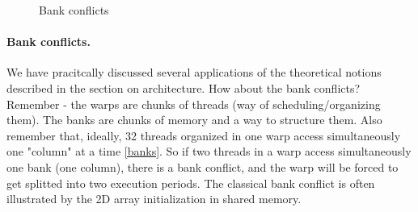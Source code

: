 {\begin{figure}[h!]
   \centering
   \qquad
   \caption{Bank conflicts}
   \label{fig:bankconflicts2}
\end{figure}

\paragraph{Bank conflicts.} We have pracitcally discussed several applications of the theoretical notions described in the section 
on architecture. How about the bank conflicts? Remember - the warps are chunks of threads (way of scheduling/organizing them). 
The banks are chunks of memory and a way to structure them. Also remember that, ideally, 32 threads 
organized in one warp access simultaneously one "column" at a time \autoref{banks}. So if two threads in a warp access simultaneously 
one bank (one column), there is a bank conflict, and the warp will be forced to get splitted into two execution periods. 
The classical bank conflict is often illustrated by the 2D array initialization in shared memory. 

}
